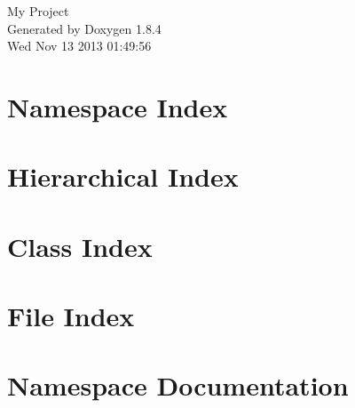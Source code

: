 \documentclass[twoside]{book}
\newcommand{\clearemptydoublepage}{%
  \newpage{\pagestyle{empty}\cleardoublepage}%
}
\begin{document}
\hypersetup{pageanchor=false}
\begin{titlepage}
\vspace*{7cm}
\begin{center}%
{\Large My Project }\\
\vspace*{1cm}
{\large Generated by Doxygen 1.8.4}\\
\vspace*{0.5cm}
{\small Wed Nov 13 2013 01:49:56}\\
\end{center}
\end{titlepage}
\clearemptydoublepage
\tableofcontents
\clearemptydoublepage
{}
\hypersetup{pageanchor=true}

\chapter{Namespace Index}

\chapter{Hierarchical Index}

\chapter{Class Index}

\chapter{File Index}

\chapter{Namespace Documentation}


\end{document}
